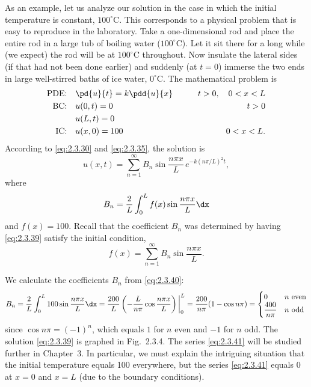 As an example, let us analyze our solution in the case in which the initial temperature is constant, $100^\circ$C. This corresponds to a physical problem that is easy to reproduce in the laboratory. Take a one-dimensional rod and place the entire rod in a large tub of boiling water ($100^\circ$C). Let it sit there for a long while (we expect) the rod will be at $100^\circ$C throughout. Now insulate the lateral sides (if that had not been done earlier) and suddenly (at $t = 0$) immerse the two ends in large well-stirred baths of ice water, $0^\circ$C. The mathematical problem is
\begin{alignat}{2}
\text{PDE:}&\quad \pd{u}{t} = k\pdd{u}{x} \qquad & t > 0,\quad 0 < x < L \label{eq:2.3.36} \\
\text{BC:}&\quad u(0,t) = 0 \qquad & t > 0 \label{eq:2.3.37} \\
&\quad u(L,t) = 0 & \notag \\
\text{IC:}&\quad u(x,0) = 100 \qquad & 0 < x < L. \label{eq:2.3.38}
\end{alignat}
According to \eqref{eq:2.3.30} and \eqref{eq:2.3.35}, the solution is
\begin{equation}
\label{eq:2.3.39}
u(x,t) = \sum_{n=1}^{\infty} B_n \sin\frac{n\pi x}{L}\,e^{-k(n\pi/L)^2 t},
\end{equation}
where
\begin{equation}
\label{eq:2.3.40}
B_n = \frac{2}{L}\int_0^L f(x)\sin\frac{n\pi x}{L}\dx
\end{equation}
and $f(x) = 100$. Recall that the coefficient $B_n$ was determined by having \eqref{eq:2.3.39} satisfy the initial condition,
\begin{equation}
\label{eq:2.3.41}
f(x) = \sum_{n=1}^{\infty} B_n \sin\frac{n\pi x}{L}.
\end{equation}

We calculate the coefficients $B_n$ from \eqref{eq:2.3.40}:
\begin{equation}
\label{eq:2.3.42}
B_n = \frac{2}{L}\int_0^L 100\sin\frac{n\pi x}{L}\dx = \frac{200}{L}\left(-\frac{L}{n\pi}\cos\frac{n\pi x}{L}\right)\bigg|_0^L = \frac{200}{n\pi}(1 - \cos n\pi) = \begin{cases} 0 & n \text{ even} \\ \dfrac{400}{n\pi} & n \text{ odd}
\end{cases}
\end{equation}
since $\cos n\pi = (-1)^n$, which equals $1$ for $n$ even and $-1$ for $n$ odd. The solution \eqref{eq:2.3.39} is graphed in Fig.~2.3.4. The series \eqref{eq:2.3.41} will be studied further in Chapter~3. In particular, we must explain the intriguing situation that the initial temperature equals 100 everywhere, but the series \eqref{eq:2.3.41} equals 0 at $x = 0$ and $x = L$ (due to the boundary conditions).

